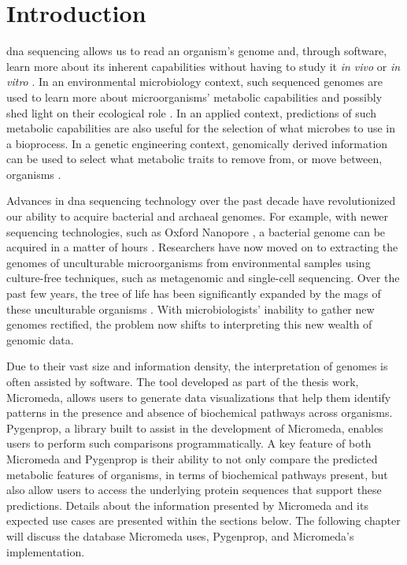 \chapter{Introduction} \label{introduction}

\gls{dna} sequencing allows us to read an organism's genome and, through software, 
learn more about its inherent capabilities without having to study it \textit{in 
vivo} or \textit{in vitro} \cite{de2012bioinformatic}. In an environmental 
microbiology context, such sequenced genomes are used to learn more about 
microorganisms' metabolic capabilities and possibly shed light on their 
ecological role \cite{de2012bioinformatic}. In an applied context, predictions 
of such metabolic capabilities are also useful for the selection of what 
microbes to use in a bioprocess. In a genetic engineering context, genomically 
derived information can be used to select what metabolic traits to remove from, 
or move between, organisms \cite{strohl2001biochemical,sanchez2005novel}.

Advances in \gls{dna} sequencing technology over the past decade have revolutionized 
our ability to acquire bacterial and archaeal genomes. For example, with newer 
sequencing technologies, such as Oxford Nanopore \cite{jain2016oxford}, a 
bacterial genome can be acquired in a matter of hours \cite{Lu2016,Cao2017}. 
Researchers have now moved on to extracting the genomes of unculturable 
microorganisms from environmental samples using culture-free techniques, such as 
metagenomic \cite{quince2017shotgun} and single-cell \cite{gawad2016single} 
sequencing. Over the past few years, the tree of life has been significantly 
expanded by the \gls{mags} \cite{bowers2017minimum} of these unculturable 
organisms \cite{Hug2016,Parks2017}. With microbiologists' inability to gather 
new genomes rectified, the problem now shifts to interpreting this new wealth of 
genomic data.

Due to their vast size and information density, the interpretation of genomes is 
often assisted by software. The tool developed as part of the thesis work, 
Micromeda, allows users to generate data visualizations that help them identify 
patterns in the presence and absence of biochemical pathways across organisms. 
Pygenprop, a library built to assist in the development of Micromeda, enables 
users to perform such comparisons programmatically. A key feature of both 
Micromeda and Pygenprop is their ability to not only compare the predicted 
metabolic features of organisms, in terms of biochemical pathways present, but 
also allow users to access the underlying protein sequences that support these 
predictions. Details about the information presented by Micromeda and its 
expected use cases are presented within the sections below. The following 
chapter will discuss the database Micromeda uses, Pygenprop, and Micromeda's 
implementation.

